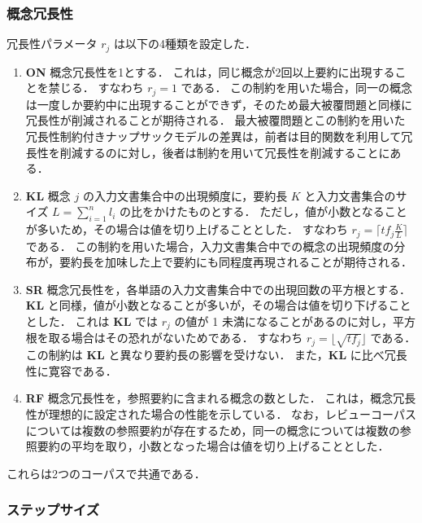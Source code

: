 \documentclass[japanese]{jnlp_1.4}
\begin{document}
\subsubsection{概念冗長性}

冗長性パラメータ $ r_{j} $ は以下の4種類を設定した．

\begin{enumerate}
\item {\bf ON }\hspace{1zw}
概念冗長性を1とする．
これは，同じ概念が2回以上要約に出現することを禁じる．
すなわち $ r_{j} = 1 $ である．
この制約を用いた場合，同一の概念は一度しか要約中に出現することができず，そのため最大被覆問題と同様に冗長性が削減されることが期待される．
最大被覆問題とこの制約を用いた冗長性制約付きナップサックモデルの差異は，前者は目的関数を利用して冗長性を削減するのに対し，後者は制約を用いて冗長性を削減することにある．
\item {\bf KL }\hspace{1zw}
概念 $ j $ の入力文書集合中の出現頻度に，要約長 $ K $ と入力文書集合のサイズ $ L = \sum^{n}_{i=1} l_{i} $ の比をかけたものとする．
ただし，値が小数となることが多いため，その場合は値を切り上げることとした．
すなわち $ r_{j} = \lceil tf_{j} \frac{K}{L} \rceil $ である．
この制約を用いた場合，入力文書集合中での概念の出現頻度の分布が，要約長を加味した上で要約にも同程度再現されることが期待される．
\item {\bf SR }\hspace{1zw}概念冗長性を，各単語の入力文書集合中での出現回数の平方根とする．
{\bf KL } と同様，値が小数となることが多いが，その場合は値を切り下げることとした．
これは {\bf KL } では $ r_{j} $ の値が 1 未満になることがあるのに対し，平方根を取る場合はその恐れがないためである．
すなわち $ r_{j} = \lfloor \sqrt{tf_{j}} \rfloor $ である．
この制約は {\bf KL } と異なり要約長の影響を受けない．
また，{\bf KL } に比べ冗長性に寛容である．
\item {\bf RF}\hspace{1zw}
概念冗長性を，参照要約に含まれる概念の数とした．
これは，概念冗長性が理想的に設定された場合の性能を示している．
なお，レビューコーパスについては複数の参照要約が存在するため，同一の概念については複数の参照要約の平均を取り，小数となった場合は値を切り上げることとした．
\end{enumerate}

これらは2つのコーパスで共通である．


\subsubsection{ステップサイズ}
\end{document}
